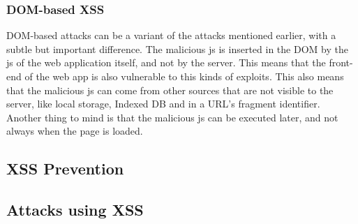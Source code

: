 \subsubsection{DOM-based XSS}
DOM-based attacks can be a variant of the attacks mentioned earlier, with a subtle but important difference. The malicious js is inserted in the DOM by the js of the web application itself, and not by the server. This means that the front-end of the web app is also vulnerable to this kinds of exploits. This also means that the malicious js can come from other sources that are not visible to the server, like local storage, Indexed DB and in a URL's fragment identifier. Another thing to mind is that the malicious js can be executed later, and not always when the page is loaded.	

\subsection{XSS Prevention}
\subsection{Attacks using XSS}


